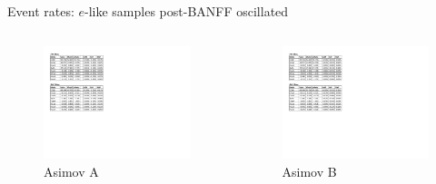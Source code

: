 \documentclass{beamer}
\begin{document}
\begin{frame}{Event rates: $e$-like samples post-BANFF oscillated}
	\centering

	\begin{columns}
		\begin{column}{0.5\paperwidth}
			\begin{figure}
				\includegraphics[page=2, trim={0cm 8cm 13cm 1cm}, clip, scale=0.52] {images/rates/postfit_A}
				\caption*{Asimov A}
			\end{figure}
		\end{column}
		\begin{column}{0.5\paperwidth}
			\begin{figure}
				\includegraphics[page=2, trim={0cm 8cm 13cm 1cm}, clip, scale=0.52] {images/rates/postfit_A}
				\caption*{Asimov B}
			\end{figure}
		\end{column}
	\end{columns}
\end{frame}
\end{document}
